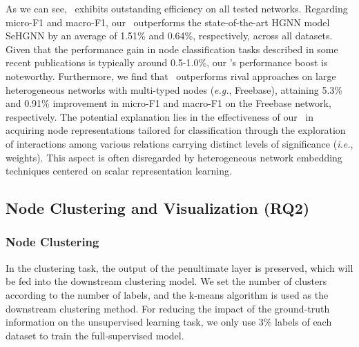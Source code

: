 As we can see, \alg\  exhibits outstanding efficiency on all tested networks. 
%
Regarding micro-F1 and macro-F1, our \alg\ outperforms the state-of-the-art HGNN model SeHGNN by an average of 1.51\% and 0.64\%, respectively, across all datasets. 
%
Given that the performance gain in node classification tasks described in some recent publications is typically around 0.5-1.0\%, our \alg's performance boost is noteworthy. 
%
Furthermore, we find that \alg\ outperforms rival approaches on large heterogeneous networks with multi-typed nodes (\emph{e.g.}, Freebase), attaining 5.3\% and 0.91\% improvement in micro-F1 and macro-F1 on the Freebase network, respectively. 
%
The potential explanation lies in the effectiveness of our \alg\ in acquiring node representations tailored for classification through the exploration of interactions among various relations carrying distinct levels of significance (\emph{i.e.}, weights). 
This aspect is often disregarded by heterogeneous network embedding techniques centered on scalar representation learning.


\subsection{Node Clustering and Visualization (\textbf{RQ2})} \label{sec:link}
\subsubsection{Node Clustering}
In the clustering task, the output of the penultimate layer is preserved, which will be fed into the downstream clustering model. 
We set the number of clusters according to the number of labels, and the k-means algorithm is used as the downstream clustering method. 
For reducing the impact of the ground-truth information on the unsupervised learning task, we only use 3\% labels of each dataset to train the full-supervised model.

